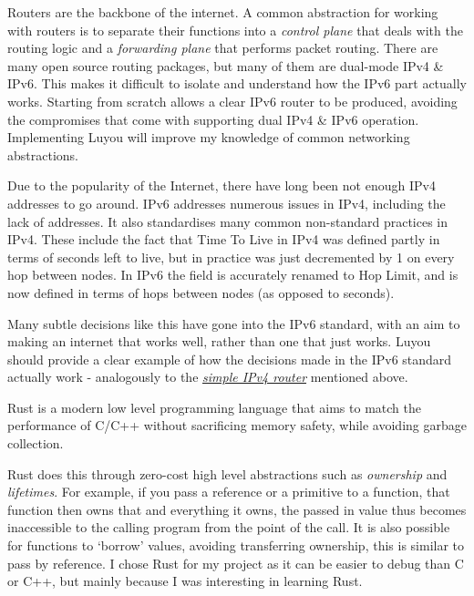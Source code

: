 \documentclass[12pt,a4paper,twoside,openany]{report}
\begin{document}
\bigskip

Routers are the backbone of the internet. A common abstraction for working with routers is to separate their functions into a \textit{control plane} that deals with the routing logic and a \textit{forwarding plane} that performs packet routing. There are many open source routing packages\cite{open_source_routing}, but many of them are dual-mode IPv4 \& IPv6. This makes it difficult to isolate and understand how the IPv6 part actually works.  Starting from scratch allows a clear IPv6 router to be produced, avoiding the compromises that come with supporting dual IPv4 \& IPv6 operation.  Implementing Luyou will improve my knowledge of common networking abstractions.

\bigskip

Due to the popularity of the Internet, there have long been not enough IPv4\cite{ipv4_rfc} addresses to go around. IPv6 addresses numerous issues in IPv4, including the lack of addresses. It also standardises many common non-standard practices in IPv4. These include the fact that Time To Live in IPv4 was defined partly in terms of seconds left to live, but in practice was just decremented by 1 on every hop between nodes. In IPv6 the field is accurately renamed to Hop Limit, and is now defined in terms of hops between nodes (as opposed to seconds). 

Many subtle decisions like this have gone into the IPv6 standard, with an aim to making an internet that works well, rather than one that just works. Luyou should provide a clear example of how the decisions made in the IPv6 standard actually work - analogously to the \hyperref[lab::simple_router]{\textit{simple IPv4 router}}\cite{simple_router} mentioned above.

\bigskip

Rust\cite{rust} is a modern low level programming language that aims to match the performance of C/C++ without sacrificing memory safety, while avoiding garbage collection.

Rust does this through zero-cost high level abstractions such as \textit{ownership} and \textit{lifetimes}. For example, if you pass a reference or a primitive to a function, that function then owns that and everything it owns, the passed in value thus becomes inaccessible to the calling program from the point of the call. It is also possible for functions to `borrow' values, avoiding transferring ownership, this is similar to pass by reference.  I chose Rust for my project as it can be easier to debug than C or C++, but mainly because I was interesting in learning Rust.
\end{document}
